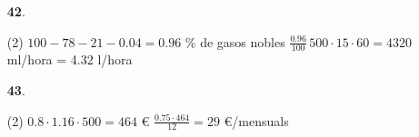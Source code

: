 \documentclass[a4paper, pdf, twoside]{book}
\begin{document}
\begin{multicols}{2}
\begin{enumerate}

 \item[\fontfamily{phv}\selectfont\color{blue}\textbf{42}. ] 
 \begin{tasks}[column-sep=1em, item-indent=1.3333em](2)
	 \task* $100-78-21-0.04=0.96$ \% de gasos nobles
	 \task* $\frac {0.96}{100}\,500 \cdot 15 \cdot 60 = 4320$ ml/hora = 4.32 l/hora
\end{tasks}
\vspace{0.25cm}



 \item[\fontfamily{phv}\selectfont\color{blue}\textbf{43}. ] 
 \begin{tasks}[column-sep=1em, item-indent=1.3333em](2)
	 \task* $0.8\cdot 1.16\cdot 500=464$ \euro {}
	 \task* $\frac {0.75\cdot 464}{12}=29$ \euro {}/mensuals
\end{tasks}
 \end{enumerate}
\vspace{0.3cm}



\end{multicols}
\end{document}
